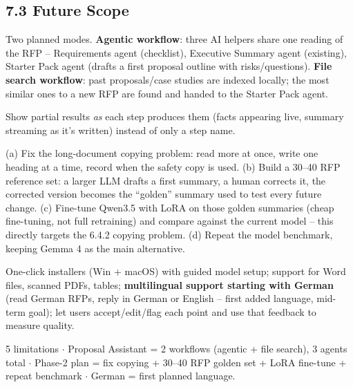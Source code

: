 \documentclass[11pt,a4paper]{article}
\begin{document}
\subsection*{7.3 Future Scope}
\begin{description}[leftmargin=3.6cm,style=nextline]
  \item[7.3.1 Proposal Assistant (Figure 7.1)] Two planned modes. \textbf{Agentic workflow}: three AI
    helpers share one reading of the RFP -- Requirements agent (checklist), Executive Summary agent
    (existing), Starter Pack agent (drafts a first proposal outline with risks/questions).
    \textbf{File search workflow}: past proposals/case studies are indexed locally; the most similar
    ones to a new RFP are found and handed to the Starter Pack agent.
  \item[7.3.2 Real-Time Progress Updates] Show partial results \emph{as} each step produces them
    (facts appearing live, summary streaming as it's written) instead of only a step name.
  \item[7.3.3 Better Summaries and Better Testing] (a) Fix the long-document copying problem: read
    more at once, write one heading at a time, record when the safety copy is used. (b) Build a
    30--40 RFP reference set: a larger LLM drafts a first summary, a human corrects it, the corrected
    version becomes the ``golden'' summary used to test every future change. (c) Fine-tune Qwen3.5
    with LoRA on those golden summaries (cheap fine-tuning, not full retraining) and compare against
    the current model -- this directly targets the 6.4.2 copying problem. (d) Repeat the model
    benchmark, keeping Gemma 4 as the main alternative.
  \item[7.3.4 App Improvements] One-click installers (Win + macOS) with guided model setup; support
    for Word files, scanned PDFs, tables; \textbf{multilingual support starting with German}
    (read German RFPs, reply in German or English -- first added language, mid-term goal); let users
    accept/edit/flag each point and use that feedback to measure quality.
\end{description}

\begin{keynums}
5 limitations $\cdot$ Proposal Assistant = 2 workflows (agentic + file search), 3 agents total
$\cdot$ Phase-2 plan = fix copying + 30--40 RFP golden set + LoRA fine-tune + repeat benchmark $\cdot$
German = first planned language.
\end{keynums}

\newpage
\end{document}
